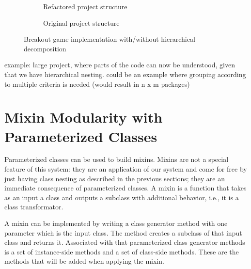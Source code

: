 \begin{figure}[!htp]
\begin{subfigure}[b]{0.45\textwidth}
\caption{Refactored project structure}
\end{subfigure}
\qquad
\begin{subfigure}[b]{0.45\textwidth}
\caption{Original project structure}
\end{subfigure}
\caption{Breakout game implementation with/without hierarchical decomposition}
\label{fig:usecase_breakout_game}
\end{figure}

example: large project, where parts of the code can now be understood, given that we have hierarchical nesting. could be an example where grouping according to multiple criteria is needed (would result in n x m packages)

\section{Mixin Modularity with Parameterized Classes}
Parameterized classes can be used to build mixins. Mixins are not a special feature of this system: they are an application of our system and come for free by just having class nesting as described in the previous sections; they are an immediate consequence of parameterized classes. A mixin is a function that takes as an input a class and outputs a subclass with additional behavior, i.e., it is a class transformator. 

A mixin can be implemented by writing a class generator method with one parameter which is the input class. The method creates a subclass of that input class and returns it. Associated with that parameterized class generator methods is a set of instance-side methods and a set of class-side methods. These are the methods that will be added when applying the mixin.

